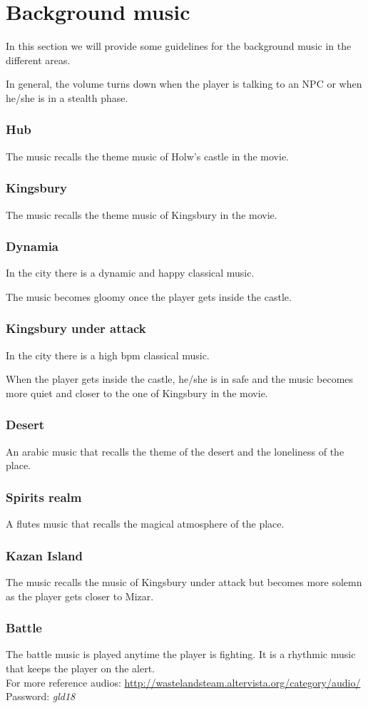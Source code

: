 \section{Background music}
In this section we will provide some guidelines for the background music in the different areas.

In general, the volume turns down when the player is talking to an NPC or when he/she is in a stealth phase.

\subsubsection{Hub}
The music recalls the theme music of Holw's castle in the movie.

\subsubsection{Kingsbury}
The music recalls the theme music of Kingsbury in the movie.

\subsubsection{Dynamia}
In the city there is a dynamic and happy classical music.

The music becomes gloomy once the player gets inside the castle.

\subsubsection{Kingsbury under attack}
In the city there is a high bpm classical music.

When the player gets inside the castle, he/she is in safe and the music becomes more quiet and closer to the one of Kingsbury in the movie.

\subsubsection{Desert}
An arabic music that recalls the theme of the desert and the loneliness of the place.

\subsubsection{Spirits realm}
A flutes music that recalls the magical atmosphere of the place.

\subsubsection{Kazan Island}
The music recalls the music of Kingsbury under attack but becomes more solemn as the player gets closer to Mizar.

\subsubsection{Battle}
The battle music is played anytime the player is fighting. It is a rhythmic music that keeps the player on the alert. \\

For more reference audios: \url{http://wastelandsteam.altervista.org/category/audio/}\\
Password: \textit{gld18}
